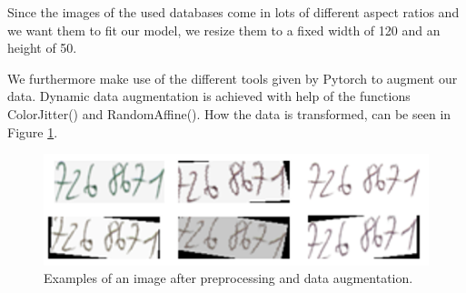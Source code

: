 \begin{table}
\caption{\label{table_string_lengths} {\it Summary of string length distribution.}}
\vspace{2mm}
\hspace{1mm}
\end{table}

Since the images of the used databases come in lots of different aspect ratios and we want them to fit our model, we resize them to a fixed width of 120 and an height of 50.

 We furthermore make use of the different tools given by Pytorch to augment our data. Dynamic data augmentation is achieved with help of the functions ColorJitter() and RandomAffine(). How the data is transformed, can be seen in Figure \ref{fig:dataAug}.

\begin{figure}
  \includegraphics[width=\linewidth]{images/Data-Augmentation.png}
  \caption{Examples of an image after preprocessing and data augmentation.}
  \label{fig:dataAug}
\end{figure}